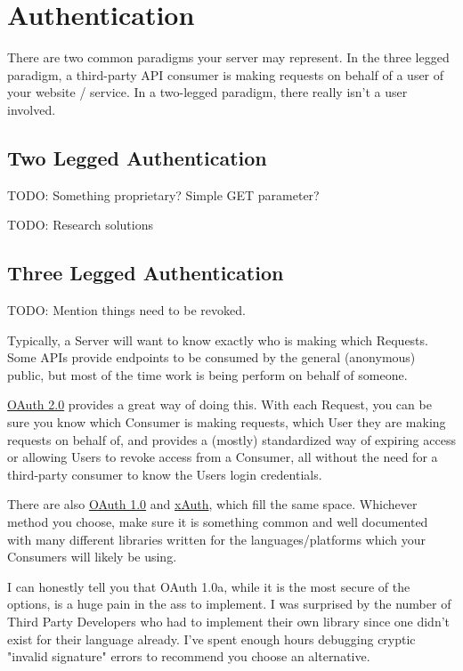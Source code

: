 \documentclass{book}
\begin{document}
\chapter{Authentication}

There are two common paradigms your server may represent. In the three legged paradigm, a third-party API consumer is making requests on behalf of a user of your website / service. In a two-legged paradigm, there really isn't a user involved.

\section{Two Legged Authentication}

TODO: Something proprietary? Simple GET parameter?

TODO: Research solutions

\section{Three Legged Authentication}

TODO: Mention things need to be revoked.

Typically, a Server will want to know exactly who is making which Requests. Some APIs provide endpoints to be consumed by the general (anonymous) public, but most of the time work is being perform on behalf of someone.

\href{https://tools.ietf.org/html/rfc6749}{OAuth 2.0} provides a great way of doing this. With each Request, you can be sure you know which Consumer is making requests, which User they are making requests on behalf of, and provides a (mostly) standardized way of expiring access or allowing Users to revoke access from a Consumer, all without the need for a third-party consumer to know the Users login credentials.

There are also \href{http://tools.ietf.org/html/rfc5849}{OAuth 1.0} and \href{https://dev.twitter.com/docs/oauth/xauth}{xAuth}, which fill the same space. Whichever method you choose, make sure it is something common and well documented with many different libraries written for the languages/platforms which your Consumers will likely be using.

I can honestly tell you that OAuth 1.0a, while it is the most secure of the options, is a huge pain in the ass to implement. I was surprised by the number of Third Party Developers who had to implement their own library since one didn't exist for their language already. I've spent enough hours debugging cryptic "invalid signature" errors to recommend you choose an alternative.
\end{document}
